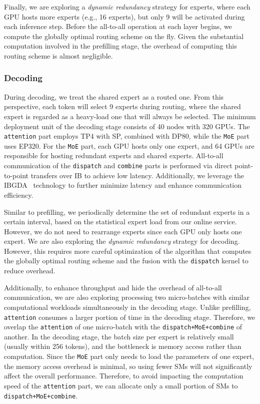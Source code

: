 \documentclass[11pt, a4paper, logo, copyright, nonumbering]{deepseek}
\begin{document}
\begin{CJK*}{UTF8}{gbsn}
Finally, we are exploring a \textit{dynamic redundancy} strategy for experts, where each GPU hosts more experts (e.g., 16 experts), but only 9 will be activated during each inference step. 
Before the all-to-all operation at each layer begins, we compute the globally optimal routing scheme on the fly. 
Given the substantial computation involved in the prefilling stage, the overhead of computing this routing scheme is almost negligible.

\subsubsection{Decoding}

During decoding, we treat the shared expert as a routed one. 
From this perspective, each token will select 9 experts during routing, where the shared expert is regarded as a heavy-load one that will always be selected. 
The minimum deployment unit of the decoding stage consists of 40 nodes with 320 GPUs. 
The \texttt{attention} part employs TP4 with SP, combined with DP80, while the \texttt{MoE} part uses EP320. 
For the \texttt{MoE} part, each GPU hosts only one expert, and 64 GPUs are responsible for hosting redundant experts and shared experts.
All-to-all communication of the \texttt{dispatch} and \texttt{combine} parts is performed via direct point-to-point transfers over IB to achieve low latency. 
Additionally, we leverage the IBGDA~\citep{nvidia_ibgda} technology to further minimize latency and enhance communication efficiency.

Similar to prefilling, we periodically determine the set of redundant experts in a certain interval, based on the statistical expert load from our online service. 
However, we do not need to rearrange experts since each GPU only hosts one expert. 
We are also exploring the \textit{dynamic redundancy} strategy for decoding. 
However, this requires more careful optimization of the algorithm that computes the globally optimal routing scheme and the fusion with the \texttt{dispatch} kernel to reduce overhead.

Additionally, to enhance throughput and hide the overhead of all-to-all communication, we are also exploring processing two micro-batches with similar computational workloads simultaneously in the decoding stage. 
Unlike prefilling, \texttt{attention} consumes a larger portion of time in the decoding stage. Therefore, we overlap the \texttt{attention} of one micro-batch with the \texttt{dispatch+MoE+combine} of another.
In the decoding stage, the batch size per expert is relatively small (usually within 256 tokens), and the bottleneck is memory access rather than computation. 
Since the \texttt{MoE} part only needs to load the parameters of one expert, the memory access overhead is minimal, so using fewer SMs will not significantly affect the overall performance.
Therefore, to avoid impacting the computation speed of the \texttt{attention} part, we can allocate only a small portion of SMs to \texttt{dispatch+MoE+combine}. 


\end{CJK*}
\end{document}
